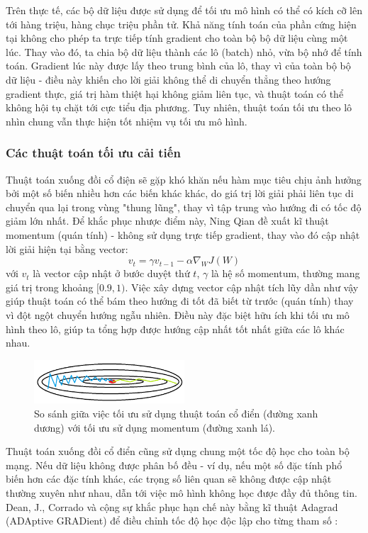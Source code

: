 \documentclass[12pt]{extreport}
\begin{document}
Trên thực tế, các bộ dữ liệu được sử dụng để tối ưu mô hình có thể có kích cỡ lên tới hàng triệu, hàng chục triệu phần tử. Khả năng tính toán của phần cứng hiện tại không cho phép ta trực tiếp tính gradient cho toàn bộ bộ dữ liệu cùng một lúc. Thay vào đó, ta chia bộ dữ liệu thành các lô (batch) nhỏ, vừa bộ nhớ để tính toán. Gradient lúc này được lấy theo trung bình của lô, thay vì của toàn bộ bộ dữ liệu - điều này khiến cho lời giải không thể di chuyển thẳng theo hướng gradient thực, giá trị hàm thiệt hại không giảm liên tục, và thuật toán có thể không hội tụ chặt tới cực tiểu địa phương. Tuy nhiên, thuật toán tối ưu theo lô nhìn chung vẫn thực hiện tốt nhiệm vụ tối ưu mô hình.

\subsubsection{Các thuật toán tối ưu cải tiến}

Thuật toán xuống đồi cổ điện sẽ gặp khó khăn nếu hàm mục tiêu chịu ảnh hưởng bởi một số biến nhiều hơn các biến khác khác, do giá trị lời giải phải liên tục di chuyển qua lại trong vùng "thung lũng", thay vì tập trung vào hướng đi có tốc độ giảm lớn nhất. Để khắc phục nhược điểm này, Ning Qian đề xuất kĩ thuật momentum (quán tính) \cite{QIAN1999145} - không sử dụng trực tiếp gradient, thay vào đó cập nhật lời giải hiện tại bằng vector:
$$ v_t = \gamma v_{t-1} - \alpha \nabla_{W} J(W)  $$
với $ v_t $ là vector cập nhật ở bước duyệt thứ $ t $, $ \gamma $ là hệ số momentum, thường mang giá trị trong khoảng $ [0.9, 1) $. Việc xây dựng vector cập nhật tích lũy dần như vậy giúp thuật toán có thể bám theo hướng đi tốt đã biết từ trước (quán tính) thay vì đột ngột chuyển hướng ngẫu nhiên. Điều này đặc biệt hữu ích khi tối ưu mô hình theo lô, giúp ta tổng hợp được hướng cập nhất tốt nhất giữa các lô khác nhau.

\begin{figure}[H]
    \centering
    \includegraphics[width=0.5\textwidth]{figure12.png}
    \caption{So sánh giữa việc tối ưu sử dụng thuật toán cổ điển (đường xanh dương) với tối ưu sử dụng momentum (đường xanh lá).}
\end{figure}

Thuật toán xuống đồi cổ điển cũng sử dụng chung một tốc độ học cho toàn bộ mạng. Nếu dữ liệu không được phân bố đều - ví dụ, nếu một số đặc tính phổ biến hơn các đặc tính khác, các trọng số liên quan sẽ không được cập nhật thường xuyên như nhau, dẫn tới việc mô hình không học được đầy đủ thông tin. Dean, J., Corrado và cộng sự khắc phục hạn chế này bằng kĩ thuật Adagrad (ADAptive GRADient) để điều chỉnh tốc độ học độc lập cho từng tham số \cite{duchi2011adaptive}:
\end{document}
